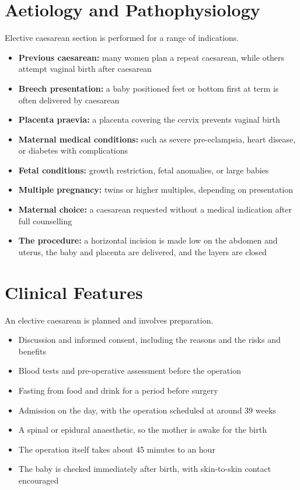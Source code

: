 \section*{Aetiology and Pathophysiology}
Elective caesarean section is performed for a range of indications.
\begin{itemize}
    \item \textbf{Previous caesarean:} many women plan a repeat caesarean, while others attempt vaginal birth after caesarean
    \item \textbf{Breech presentation:} a baby positioned feet or bottom first at term is often delivered by caesarean
    \item \textbf{Placenta praevia:} a placenta covering the cervix prevents vaginal birth
    \item \textbf{Maternal medical conditions:} such as severe pre-eclampsia, heart disease, or diabetes with complications
    \item \textbf{Fetal conditions:} growth restriction, fetal anomalies, or large babies
    \item \textbf{Multiple pregnancy:} twins or higher multiples, depending on presentation
    \item \textbf{Maternal choice:} a caesarean requested without a medical indication after full counselling
    \item \textbf{The procedure:} a horizontal incision is made low on the abdomen and uterus, the baby and placenta are delivered, and the layers are closed
\end{itemize}

\section*{Clinical Features}
An elective caesarean is planned and involves preparation.
\begin{itemize}
    \item Discussion and informed consent, including the reasons and the risks and benefits
    \item Blood tests and pre-operative assessment before the operation
    \item Fasting from food and drink for a period before surgery
    \item Admission on the day, with the operation scheduled at around 39 weeks
    \item A spinal or epidural anaesthetic, so the mother is awake for the birth
    \item The operation itself takes about 45 minutes to an hour
    \item The baby is checked immediately after birth, with skin-to-skin contact encouraged
\end{itemize}

